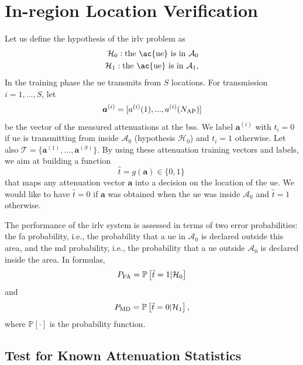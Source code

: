 \documentclass[conference,final]{IEEEtran}
\newcommand{\pr}[1]{\mathbb{P} \left[ #1 \right]}
\begin{document}
\section{In-region Location Verification}\label{sec: ml}
Let us define the hypothesis of the \ac{irlv} problem as
 \begin{equation}
\begin{split}
  \mathcal H_0: \mbox{the \ac{ue} is in $\mathcal{A}_0$} \\
  \mathcal H_1: \mbox{the \ac{ue} is in $\mathcal{A}_1$}, 
  \end{split}
\end{equation}
In the training phase the \ac{ue} transmits from $S$ locations. For transmission $i=1,...,S$, let
\begin{equation}
    \bm{a}^{(i)}=[a^{(i)}(1),...,a^{(i)}(N_{\rm AP})]
\end{equation}
be the vector of the measured attenuations at the  \acp{bs}. We label $\bm a ^{(i)}$ with $t_i=0$ if \ac{ue} is transmitting from inside $\mathcal{A}_0$ (hypothesis $\mathcal{H}_0$) and $t_i=1$ otherwise. Let also $\mathcal{T} =
 \{\bm{a}^{(1)}, \dots , \bm{a}^{(S)} \}$.
By using these attenuation training vectors and labels, we aim at building a function
\begin{equation}
    \hat{t} = g(\bm{a}) \in \{0,1\}\,
\end{equation}
that maps any attenuation vector $\bm{a}$ into a decision on the location of the \ac{ue}. We would like to have $\hat{t}=0$ if $\bm a$ was obtained when the \ac{ue} was inside $\mathcal{A}_0$ and $\hat{t}=1$ otherwise.

The performance of the \ac{irlv} system is assessed in terms of two error probabilities: the \ac{fa} probability, i.e., the probability  that a \ac{ue} in $\mathcal A_0$ is declared outside this area, and the \ac{md} probability, i.e., the probability that a \ac{ue} outside $\mathcal A_0$ is declared inside the area. In formulas, 
\begin{equation}
P_{\rm FA} =\pr{\hat{t} =1 | \mathcal H_0}
\end{equation} 
and  
\begin{equation}
 P_{\rm MD}=\pr{\hat{t} = 0 | \mathcal H_1},   
\end{equation}
where $\pr{\cdot}$ is the probability function.

\subsection{Test for Known Attenuation Statistics}
\end{document}
